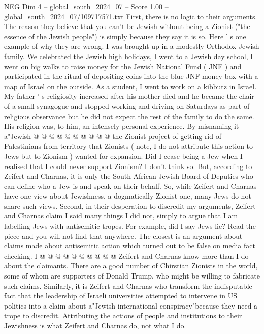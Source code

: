 \begin{textsample}{NEG Dim 4 – global\_south\_2024\_07 – Score 1.00 – global\_south\_2024\_07/109717571.txt}  \label{ex:f4_neg_342}
First, there is no logic to their arguments.
The reason they believe that you can't be Jewish without being a Zionist ("the essence of the Jewish people") is simply because they say it is so.
Here ' s one example of why they are wrong.
I was brought up in a modestly Orthodox Jewish family.
We celebrated the Jewish high holidays, I went to a Jewish day school, I went on big walks to raise money for the Jewish National Fund ( JNF ) and participated in the ritual of depositing coins into the blue JNF money box with a map of Israel on the outside.
As a student, I went to work on a kibbutz in Israel.
My father ' s religiosity increased after his mother died and he became the chair of a small synagogue and stopped working and driving on Saturdays as part of religious observance but he did not expect the rest of the family to do the same.
His religion was, to him, an intensely personal experience.
By misnaming it a"Jewish @ @ @ @ @ @ @ @ @ @ the Zionist project of getting rid of Palestinians from territory that Zionists ( note, I do not attribute this action to Jews but to Zionism ) wanted for expansion.
Did I cease being a Jew when I realised that I could never support Zionism?
I don't think so.
But, according to Zeifert and Charnas, it is only the South African Jewish Board of Deputies who can define who a Jew is and speak on their behalf.
So, while Zeifert and Charnas have one view about Jewishness, a dogmatically Zionist one, many Jews do not share such views.
Second, in their desperation to discredit my arguments, Zeifert and Charnas claim I said many things I did not, simply to argue that I am labelling Jews with antisemitic tropes.
For example, did I say Jews lie?
Read the piece and you will not find that anywhere.
The closest is an argument about claims made about antisemitic action which turned out to be false on media fact checking.
I @ @ @ @ @ @ @ @ @ @ Zeifert and Charnas know more than I do about the claimants.
There are a good number of Chirstian Zionists in the world, some of whom are supporters of Donald Trump, who might be willing to fabricate such claims.
Similarly, it is Zeifert and Charnas who transform the indisputable fact that the leadership of Israeli universities attempted to intervene in US politics into a claim about a"Jewish international conspiracy"because they need a trope to discredit.
Attributing the actions of people and institutions to their Jewishness is what Zeifert and Charnas do, not what I do.

\end{textsample}
